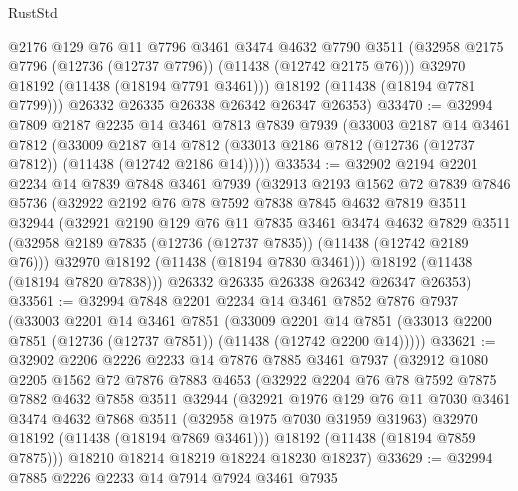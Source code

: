 \begin{lexlean}{RustStd}
\begin{coremodule}
          @2176
          @129
          @76
          @11
          @7796
          @3461
          @3474
          @4632
          @7790
          @3511
          (@32958 @2175 @7796 (@12736 (@12737 @7796)) (@11438 (@12742 @2175 @76)))
          @32970
          @18192
          (@11438 (@18194 @7791 @3461)))
        @18192
        (@11438 (@18194 @7781 @7799)))
      @26332
      @26335
      @26338
      @26342
      @26347
      @26353)
@33470 := @32994
    @7809
    @2187
    @2235
    @14
    @3461
    @7813
    @7839
    @7939
    (@33003
      @2187
      @14
      @3461
      @7812
      (@33009
        @2187
        @14
        @7812
        (@33013 @2186 @7812 (@12736 (@12737 @7812)) (@11438 (@12742 @2186 @14)))))
@33534 := @32902
    @2194
    @2201
    @2234
    @14
    @7839
    @7848
    @3461
    @7939
    (@32913
      @2193
      @1562
      @72
      @7839
      @7846
      @5736
      (@32922
        @2192
        @76
        @78
        @7592
        @7838
        @7845
        @4632
        @7819
        @3511
        @32944
        (@32921
          @2190
          @129
          @76
          @11
          @7835
          @3461
          @3474
          @4632
          @7829
          @3511
          (@32958 @2189 @7835 (@12736 (@12737 @7835)) (@11438 (@12742 @2189 @76)))
          @32970
          @18192
          (@11438 (@18194 @7830 @3461)))
        @18192
        (@11438 (@18194 @7820 @7838)))
      @26332
      @26335
      @26338
      @26342
      @26347
      @26353)
@33561 := @32994
    @7848
    @2201
    @2234
    @14
    @3461
    @7852
    @7876
    @7937
    (@33003
      @2201
      @14
      @3461
      @7851
      (@33009
        @2201
        @14
        @7851
        (@33013 @2200 @7851 (@12736 (@12737 @7851)) (@11438 (@12742 @2200 @14)))))
@33621 := @32902
    @2206
    @2226
    @2233
    @14
    @7876
    @7885
    @3461
    @7937
    (@32912
      @1080
      @2205
      @1562
      @72
      @7876
      @7883
      @4653
      (@32922
        @2204
        @76
        @78
        @7592
        @7875
        @7882
        @4632
        @7858
        @3511
        @32944
        (@32921
          @1976
          @129
          @76
          @11
          @7030
          @3461
          @3474
          @4632
          @7868
          @3511
          (@32958 @1975 @7030 @31959 @31963)
          @32970
          @18192
          (@11438 (@18194 @7869 @3461)))
        @18192
        (@11438 (@18194 @7859 @7875)))
      @18210
      @18214
      @18219
      @18224
      @18230
      @18237)
@33629 := @32994 @7885 @2226 @2233 @14 @7914 @7924 @3461 @7935

\end{coremodule}
\end{lexlean}
